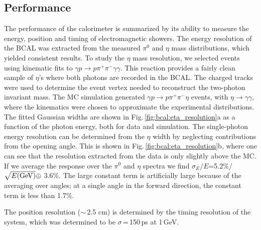 \subsection{Performance \label{sec:calperformance}}
The performance of the calorimeter is summarized by its ability to measure the energy, position and timing of electromagnetic showers. 
The energy resolution of the BCAL was extracted from the measured $\pi^0$ and
$\eta$ mass distributions, which yielded consistent results. To study the $\eta$ mass resolution, we selected events
using kinematic fits to $\gamma p \rightarrow p \pi^+ \pi^- \gamma \gamma$. 
This reaction provides a fairly clean sample of $\eta$'s where both photons are recorded in the BCAL. The charged tracks were used to determine the event vertex needed to reconstruct the two-photon invariant mass.  The MC simulation 
generated $\gamma p \rightarrow p \pi^+ \pi^- \eta$ events, with $\eta\rightarrow \gamma\gamma$, where the kinematics were chosen to approximate the experimental distributions. The fitted Gaussian widths are shown in Fig.\,\ref{fig:bcal:eta_resolution}a as a function of the photon energy, both for data and simulation. 
The single-photon energy resolution can be determined from the $\eta$ width by neglecting contributions from the opening angle.
This is shown in Fig.\,\ref{fig:bcal:eta_resolution}b, where one can see that the resolution extracted from the data is only slightly above the MC. If we average the response over the $\pi^0$ and $\eta$ spectra we find 
$\sigma_E/E$=5.2\%/$\sqrt{E(\rm{GeV})} \oplus$ 3.6\%. The large constant term is artificially large because of the averaging over angles; at a single angle in the forward direction, the constant term is less than 1.7\%.

The position resolution ($\sim$\,2.5 cm) is determined by the timing resolution of the system, which was determined to be $\sigma$\,=\,150\,ps at 1\,GeV.
 


